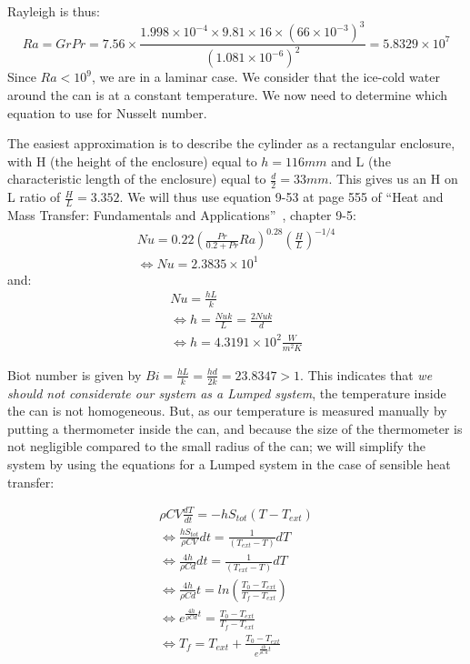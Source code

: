\documentclass{report}
\begin{document}
	
	Rayleigh is thus: 
	\begin{equation}
		Ra = GrPr= 7.56\times \frac{1.998\times 10^{-4}\times 9.81\times 16\times (66\times 10^{-3})^3}{(1.081\times 10^{-6})^2}= 5.8329\times 10^{7}
	\end{equation}
	Since $Ra<10^9$, we are in a laminar case. We consider that the ice-cold water around the can is at a constant temperature. We now need to determine which equation to use for Nusselt number.
	
	The easiest approximation is to describe the cylinder as a rectangular enclosure, with H (the height of the enclosure) equal to $h=116mm$ and L (the characteristic length of the enclosure) equal to $\frac{d}{2}=33mm$. This gives us an H on L ratio of $\frac{H}{L}=3.352$. We will thus use equation 9-53 at page 555 of ``Heat and Mass Transfer: Fundamentals and Applications''~\cite{HaMT}, chapter 9-5:
	\begin{equation}
		\begin{gathered}
		Nu=0.22(\frac{Pr}{0.2+Pr}Ra)^{0.28}(\frac{H}{L})^{-1/4}\\
		\Leftrightarrow Nu=2.3835\times 10^{1}
		\end{gathered}	
	\end{equation}
	and:
	\begin{equation}
		\begin{gathered}
		Nu=\frac{hL}{k}\\
		\Leftrightarrow h=\frac{Nu k}{L}=\frac{2Nu k}{d}\\
		\Leftrightarrow h=4.3191\times 10^2 \frac{W}{m^2K}
		\end{gathered}	
	\end{equation}
	
	Biot number is given by $Bi=\frac{hL}{k}=\frac{hd}{2k}=23.8347 > 1$. This indicates that \emph{we should not considerate our system as a Lumped system}, the temperature inside the can is not homogeneous. But, as our temperature is measured manually by putting a thermometer inside the can, and because the size of the thermometer is not negligible compared to the small radius of the can; we will simplify the system by using the equations for a Lumped system in the case of sensible heat transfer:
	
	\begin{equation}
		\begin{gathered}
		\rho CV\frac{dT}{dt}=-hS_{tot}(T-T_{ext})\\
		\Leftrightarrow \frac{hS_{tot}}{\rho CV}dt=\frac{1}{(T_{ext}-T)}dT\\
		\Leftrightarrow \frac{4h}{\rho Cd}dt=\frac{1}{(T_{ext}-T)}dT\\
		\Leftrightarrow \frac{4h}{\rho Cd}t=ln(\frac{T_0-T_{ext}}{T_f-T_{ext}})\\
		\Leftrightarrow e^{\frac{4h}{\rho Cd}t}=\frac{T_0-T_{ext}}{T_f-T_{ext}}\\
		\Leftrightarrow T_f=T_{ext}+\frac{T_0-T_{ext}}{e^{\frac{4h}{\rho Cd}t}}
		\end{gathered}
	\end{equation}
	
\end{document}
